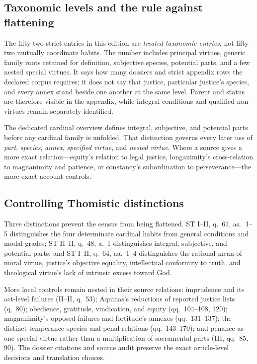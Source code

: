 {\subsection{Taxonomic levels and the rule against flattening}

The fifty-two strict entries in this edition are \emph{treated taxonomic entries}, not fifty-two mutually coordinate habits. The number includes principal virtues, generic family roots retained for definition, subjective species, potential parts, and a few nested special virtues. It says how many dossiers and strict appendix rows the declared corpus requires; it does not say that justice, particular justice's species, and every annex stand beside one another at the same level. Parent and status are therefore visible in the appendix, while integral conditions and qualified non-virtues remain separately identified.

The dedicated cardinal overview defines integral, subjective, and potential parts before any cardinal family is unfolded. That distinction governs every later use of \emph{part}, \emph{species}, \emph{annex}, \emph{specified virtue}, and \emph{nested virtue}. Where a source gives a more exact relation---equity's relation to legal justice, longanimity's cross-relation to magnanimity and patience, or constancy's subordination to perseverance---the more exact account controls.

\subsection{Controlling Thomistic distinctions}

Three distinctions prevent the census from being flattened. ST I--II, q.~61, aa.~1--5 distinguishes the four determinate cardinal habits from general conditions and modal grades; ST II--II, q.~48, a.~1 distinguishes integral, subjective, and potential parts; and ST I--II, q.~64, aa.~1--4 distinguishes the rational mean of moral virtue, justice's objective equality, intellectual conformity to truth, and theological virtue's lack of intrinsic excess toward God.

More local controls remain nested in their source relations: imprudence and its act-level failures (II--II, q.~53); Aquinas's reductions of reported justice lists (q.~80); obedience, gratitude, vindication, and equity (qq.~104--108, 120); magnanimity's opposed failures and fortitude's annexes (qq.~131--137); the distinct temperance species and penal relations (qq.~143--170); and penance as one special virtue rather than a multiplication of sacramental parts (III, qq.~85, 90). The dossier citations and source audit preserve the exact article-level decisions and translation choices.

}
